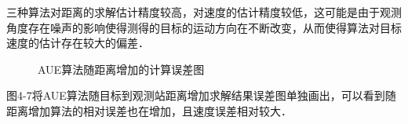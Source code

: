 三种算法对距离的求解估计精度较高，对速度的估计精度较低，这可能是由于观测角度存在噪声的影响使得测得的目标的运动方向在不断改变，从而使得算法对目标速度的估计存在较大的偏差．

\begin{figure}[htbp]
	\centering
	
	\caption{AUE算法随距离增加的计算误差图}
\end{figure}
图4-7将AUE算法随目标到观测站距离增加求解结果误差图单独画出，可以看到随距离增加算法的相对误差也在增加，且速度误差相对较大．
